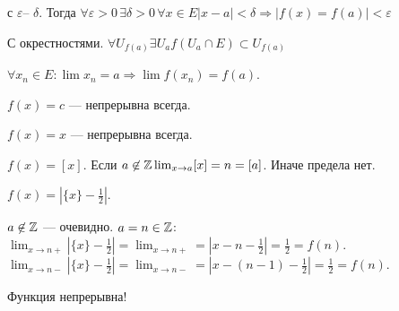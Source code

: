 \begin{definition}
    с  $\varepsilon$-- $\delta$. Тогда  $\forall \varepsilon > 0 \, \exists \delta > 0 \, \forall x \in E |x-a| < \delta \Rightarrow |f(x) = f(a)| < \varepsilon$
\end{definition}
\begin{definition}
    С окрестностями. $\forall U_{f(a)} \exists U_a f(U_a \cap E) \subset U_{f(a)}$
\end{definition}
\begin{definition}
    $\forall x_n \in E: \lim x_n = a \Rightarrow \lim f(x_n) = f(a)$.
\end{definition}
\begin{example}
    $f(x) = c$ --- непрерывна всегда.
\end{example}
\begin{example}
    $f(x) = x$ --- непрерывна всегда.
\end{example}
\begin{example}
    $f(x) = [x]$. Если  $a \not \in \mathbb{Z} \lim_{x\to a} [x] = n = [a]$. Иначе предела нет.
\end{example}
\begin{example}
    $f(x) = |\{x\} - \frac{1}{2}|$.

    $a \not \in \mathbb{Z}$ --- очевидно.
    $a = n \in \mathbb{Z}$:  $\lim_{x \to n+} |\{x\} - \frac{1}{2} | = \lim_{x \to n+} = |x-n-\frac{1}{2}| = \frac{1}{2} = f(n)$. $\lim_{x \to n-} |\{x\} - \frac{1}{2}| = \lim_{x\to n-} = |x-(n-1)-\frac{1}{2}| = \frac{1}{2} = f(n)$.

    Функция непрерывна!
\end{example}

